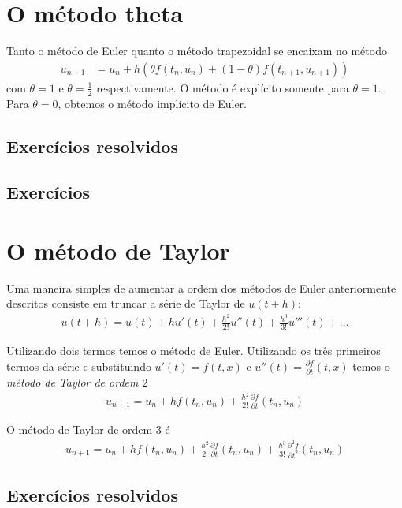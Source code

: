 \section{O método theta}
Tanto o método de Euler quanto o método trapezoidal se encaixam no método
\begin{eqnarray}
  u_{n+1} &= u_n +  h (\theta f(t_n,u_n)+(1-\theta )f(t_{n+1},u_{n+1}))
\end{eqnarray}
com $\theta =1$ e $\theta =\frac{1}{2}$ respectivamente. O método é explícito somente para $\theta =1$. Para $\theta =0$, obtemos o método implícito de Euler.

\subsection*{Exercícios resolvidos}

\emconstrucao

\subsection*{Exercícios}

\emconstrucao


\section{O método de Taylor}
Uma maneira simples de aumentar a ordem dos métodos de Euler anteriormente descritos consiste em truncar a série de Taylor de $u(t+h)$:
\begin{eqnarray}
 u(t+h)=u(t) +h u'(t)+ \frac{h^2}{2!}u''(t)+\frac{h^3}{3!}u'''(t)+\ldots
\end{eqnarray}

Utilizando dois termos temos o método de Euler. Utilizando os três primeiros termos da série e substituindo $u'(t)=f(t,x)$ e $u''(t)=\frac{\partial f}{\partial t}(t,x)$ temos o \emph{método de Taylor de ordem $2$}
\begin{eqnarray}
   u_{n+1}=u_n +h f(t_n,u_n)+ \frac{h^2}{2!} \frac{\partial f}{\partial t}(t_n,u_n)
\end{eqnarray}


O método de Taylor de ordem $3$ é
\begin{eqnarray*}
   u_{n+1}=u_n +h f(t_n,u_n)+ \frac{h^2}{2!}\frac{\partial f}{\partial t}(t_n,u_n)+\frac{h^3}{3!}\frac{\partial^2 f}{\partial t^2}(t_n,u_n)
\end{eqnarray*}

\subsection*{Exercícios resolvidos}

